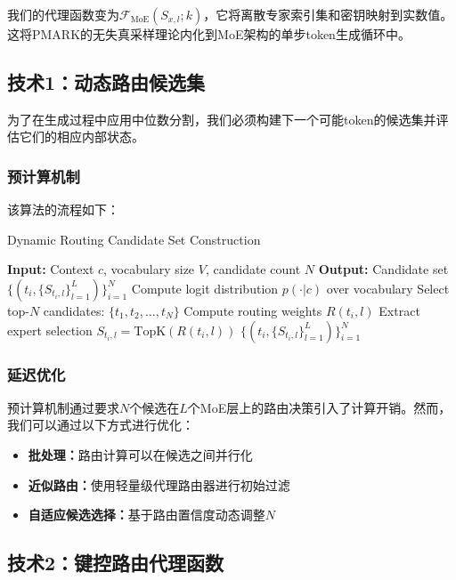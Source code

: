 \documentclass[letterpaper,twocolumn,10pt]{article}
\begin{document}
我们的代理函数变为$\mathcal{F}_{\text{MoE}}(S_{x,l}; k)$，它将离散专家索引集和密钥映射到实数值。这将PMARK的无失真采样理论内化到MoE架构的单步token生成循环中。

\subsection{技术1：动态路由候选集}

为了在生成过程中应用中位数分割，我们必须构建下一个可能token的候选集并评估它们的相应内部状态。

\subsubsection{预计算机制}

该算法的流程如下：

\begin{algorithm}
\caption{Dynamic Routing Candidate Set Construction}
\begin{algorithmic}[1]
\STATE \textbf{Input:} Context $c$, vocabulary size $V$, candidate count $N$
\STATE \textbf{Output:} Candidate set $\{(t_i, \{S_{t_i,l}\}_{l=1}^L)\}_{i=1}^N$
\STATE Compute logit distribution $p(\cdot|c)$ over vocabulary
\STATE Select top-$N$ candidates: $\{t_1, t_2, \ldots, t_N\}$
        \STATE Compute routing weights $R(t_i, l)$
        \STATE Extract expert selection $S_{t_i,l} = \text{TopK}(R(t_i, l))$
    \ENDFOR
\ENDFOR
\RETURN $\{(t_i, \{S_{t_i,l}\}_{l=1}^L)\}_{i=1}^N$
\end{algorithmic}
\end{algorithm}

\subsubsection{延迟优化}

预计算机制通过要求$N$个候选在$L$个MoE层上的路由决策引入了计算开销。然而，我们可以通过以下方式进行优化：

\begin{itemize}
\item \textbf{批处理：}路由计算可以在候选之间并行化
\item \textbf{近似路由：}使用轻量级代理路由器进行初始过滤
\item \textbf{自适应候选选择：}基于路由置信度动态调整$N$
\end{itemize}

\subsection{技术2：键控路由代理函数}
\end{document}
